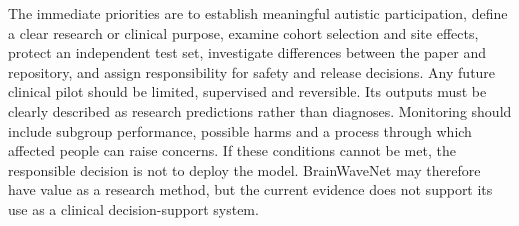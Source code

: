 \documentclass[11pt,a4paper]{article}
\begin{document}
The immediate priorities are to establish meaningful autistic participation, define a clear research or clinical purpose, examine cohort selection and site effects, protect an independent test set, investigate differences between the paper and repository, and assign responsibility for safety and release decisions. Any future clinical pilot should be limited, supervised and reversible. Its outputs must be clearly described as research predictions rather than diagnoses. Monitoring should include subgroup performance, possible harms and a process through which affected people can raise concerns. If these conditions cannot be met, the responsible decision is not to deploy the model. BrainWaveNet may therefore have value as a research method, but the current evidence does not support its use as a clinical decision-support system.

\printbibliography[heading=bibintoc,title={References}]
\end{document}
